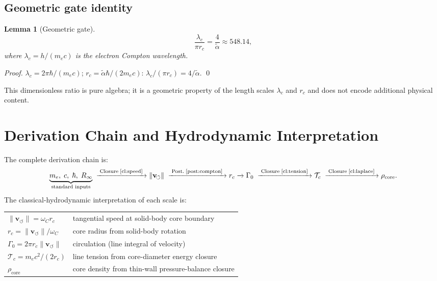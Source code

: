 \documentclass[aps,pra,preprint,longbibliography,nofootinbib]{revtex4-2}
\newtheorem{lemma}{Lemma}
\newcommand{\vnorm}{\lVert\mathbf{v}_{\!\boldsymbol{\circlearrowleft}}\rVert} %
\newcommand{\rhocore}{\rho_{\mathrm{core}}}      %
\newcommand{\rc}{r_c}                            %
\newcommand{\omC}{\omega_C}                      %
\newcommand{\lc}{\lambda_c}                      %
\newcommand{\Tc}{\mathcal{T}_c}                  %
\newcommand{\Gz}{\Gamma_0}                       %
\begin{document}
\subsection{Geometric gate identity}
\label{sec:gate}

\begin{lemma}[Geometric gate]
\label{lem:gate}
\begin{equation}
  \frac{\lc}{\pi\rc} = \frac{4}{\tilde\alpha} \approx 548.14,
  \label{eq:gate}
\end{equation}
where $\lc = h/(m_ec)$ is the electron Compton wavelength.
\end{lemma}

\begin{proof}
$\lc = 2\pi\hbar/(m_ec)$; $\rc = \tilde\alpha\hbar/(2m_ec)$:
$\lc/(\pi\rc) = 4/\tilde\alpha$. \qed
\end{proof}

This dimensionless ratio is pure algebra; it is a geometric property
of the length scales $\lc$ and $\rc$ and does not encode additional
physical content.

\section{Derivation Chain and Hydrodynamic Interpretation}
\label{sec:chain}

The complete derivation chain is:
\begin{equation}
  \underbrace{m_e,\;c,\;\hbar,\;R_\infty}_{\text{standard inputs}}
  \;\xrightarrow{\;\text{Closure\;\ref{cl:speed}}\;}
  \vnorm
  \;\xrightarrow{\;\text{Post.\;\ref{post:compton}}\;}
  \rc
  \xrightarrow{}
  \Gz
  \;\xrightarrow{\;\text{Closure\;\ref{cl:tension}}\;}
  \Tc
  \;\xrightarrow{\;\text{Closure\;\ref{cl:laplace}}\;}
  \rhocore.
  \label{eq:chain}
\end{equation}
The classical-hydrodynamic interpretation of each scale is:

\medskip
\begin{tabular}{@{}ll@{}}
$\vnorm = \omC\rc$ & tangential speed at solid-body core boundary \\
$\rc = \vnorm/\omC$ & core radius from solid-body rotation \\
$\Gz = 2\pi\rc\vnorm$ & circulation (line integral of velocity) \\
$\Tc = m_e c^2/(2\rc)$ & line tension from core-diameter energy closure \\
$\rhocore$ & core density from thin-wall pressure-balance closure \\
\end{tabular}
\end{document}

